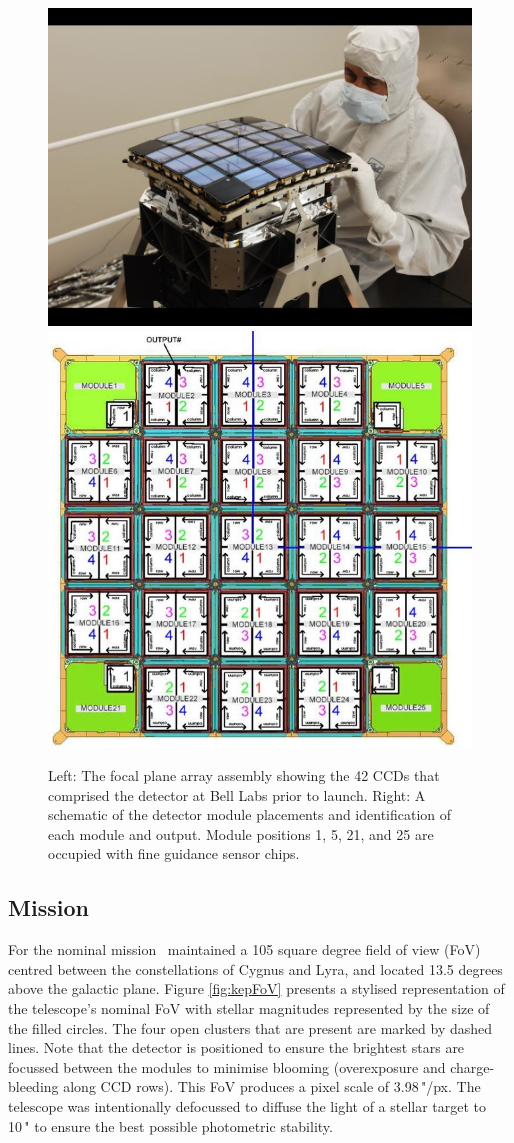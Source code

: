 \begin{figure}[htbp]
    \centering
    \includegraphics[width=0.45\linewidth]{Chapter1/Kepler_detector.jpg}
    \includegraphics[width=0.45\linewidth]{Chapter1/kepCCD.jpg}
    \caption[Kepler CCD detector array prior to installation]{Left: The focal plane array assembly showing the 42 CCDs that comprised the detector at Bell Labs prior to launch. Right: A schematic of the detector module placements and identification of each module and output. Module positions 1, 5, 21, and 25 are occupied with fine guidance sensor chips.}
    \label{fig:Kep_detect}
\end{figure}

\subsection{Mission}
For the nominal mission \Kepler~maintained a 105 square degree field of view (FoV) centred between the constellations of Cygnus and Lyra, and located 13.5 degrees above the galactic plane. Figure \ref{fig:kepFoV} presents a stylised representation of the telescope's nominal FoV with stellar magnitudes represented by the size of the filled circles. The four open clusters that are present are marked by dashed lines. Note that the detector is positioned to ensure the brightest stars are focussed between the modules to minimise blooming (overexposure and charge-bleeding along CCD rows). This FoV produces a pixel scale of 3.98\,"/px. The telescope was intentionally defocussed to diffuse the light of a stellar target to 10\," to ensure the best possible photometric stability.

